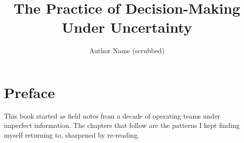 \documentclass[12pt,letterpaper]{book}
\title{The Practice of Decision-Making Under Uncertainty}
\author{Author Name (scrubbed)}
\begin{document}
\maketitle
\frontmatter
\chapter*{Preface}
This book started as field notes from a decade of operating teams under
imperfect information. The chapters that follow are the patterns I kept
finding myself returning to, sharpened by re-reading.
\end{document}
